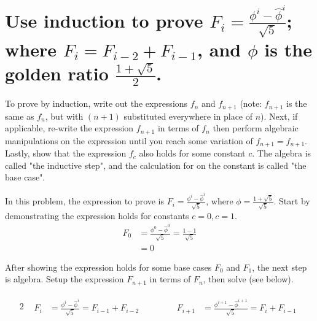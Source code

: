 \section[Problem 2]{Use induction to prove $F_i = \frac{\phi^i - \hat{\phi}^i}{\sqrt{5}}$; where $F_i = F_{i-2} + F_{i-1}$, and $\phi$ is the golden ratio $\frac{1 + \sqrt{5}}{2}$.}

To prove by induction, write out the expressions $f_n$ and $f_{n + 1}$ (note: $f_{n + 1}$ is the same as $f_n$, but with $(n + 1)$ substituted everywhere in place of $n$). Next, if applicable, re-write the expression $f_{n + 1}$ in terms of $f_n$ then perform algebraic manipulations on the expression until you reach some variation of $f_{n + 1} = f_{n + 1}$.  Lastly, show that the expression $f_c$ also holds for some constant $c$. The algebra is called "the inductive step", and the calculation for on the constant is called "the base case".

In this problem, the expression to prove is $F_i = \frac{\phi^i - \hat{\phi}^i}{\sqrt{5}}$, where $\phi = \frac{1 + \sqrt{5}}{\sqrt{5}}$. Start by demonstrating the expression holds for constants $c = 0, c = 1$. 
\begin{align}
	F_0 &= \frac{\phi^0 - \hat{\phi}^0}{\sqrt{5}} = \frac{1 - 1}{\sqrt{5}} \\
		&= 0 
\end{align}

After showing the expression holds for some base cases $F_0$ and $F_1$, the next step is algebra. Setup the expression $F_{n + 1}$ in terms of $F_n$, then solve (see below).

\setcounter{equation}{0}
\begin{alignat*}{2}
	&
	\begin{aligned}
		F_i &= \frac{\phi^i - \hat{\phi}^i}{\sqrt{5}} = F_{i - 1} + F_{i - 2}
	\end{aligned}
	& \qquad &
	\begin{aligned}
		F_{i + 1} &= \frac{\phi^{i + 1} - \hat{\phi}^{i + 1}}{\sqrt{5}} = F_{i} + F_{i - 1}
	\end{aligned}
\end{alignat*}

